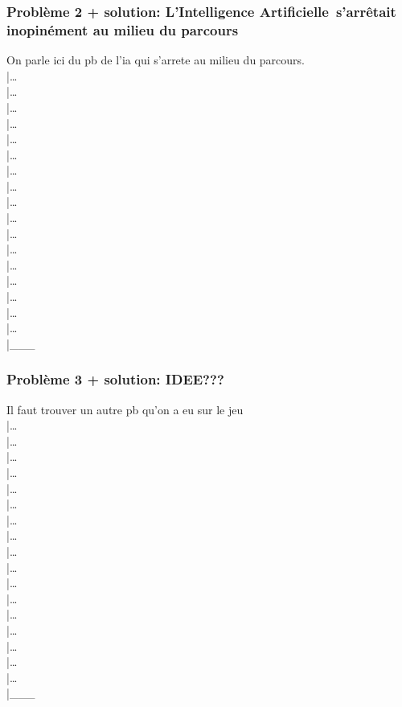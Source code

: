 \documentclass[12pt,a4paper]{article}
\newcommand{\AI}{Intelligence Artificielle}
\begin{document}
            \subsubsection{Problème 2 + solution: L'\AI\, s'arrêtait inopinément au milieu du parcours}
                On parle ici du pb de l'ia qui s'arrete au milieu du parcours.\\
                |\dots\\|\dots\\|\dots\\|\dots\\|\dots\\|\dots\\|\dots\\|\dots\\|\dots\\
                |\dots\\|\dots\\|\dots\\|\dots\\|\dots\\|\dots\\|\dots\\|\dots\\|\_\_\_\\

            \subsubsection{Problème 3 + solution: IDEE???}
                Il faut trouver un autre pb qu'on a eu sur le jeu\\
                |\dots\\|\dots\\|\dots\\|\dots\\|\dots\\|\dots\\|\dots\\|\dots\\|\dots\\
                |\dots\\|\dots\\|\dots\\|\dots\\|\dots\\|\dots\\|\dots\\|\dots\\|\_\_\_\\

    \clearpage
\end{document}
